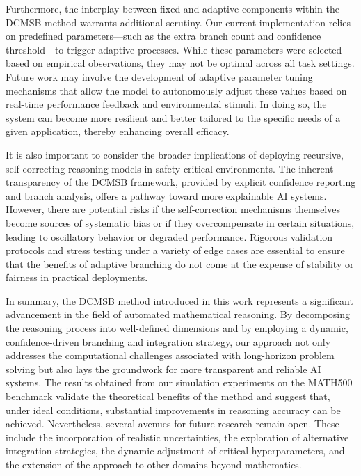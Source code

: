 \documentclass{article}
\begin{document}
Furthermore, the interplay between fixed and adaptive components within the DCMSB method warrants additional scrutiny. Our current implementation relies on predefined parameters—such as the extra branch count and confidence threshold—to trigger adaptive processes. While these parameters were selected based on empirical observations, they may not be optimal across all task settings. Future work may involve the development of adaptive parameter tuning mechanisms that allow the model to autonomously adjust these values based on real-time performance feedback and environmental stimuli. In doing so, the system can become more resilient and better tailored to the specific needs of a given application, thereby enhancing overall efficacy.

It is also important to consider the broader implications of deploying recursive, self-correcting reasoning models in safety-critical environments. The inherent transparency of the DCMSB framework, provided by explicit confidence reporting and branch analysis, offers a pathway toward more explainable AI systems. However, there are potential risks if the self-correction mechanisms themselves become sources of systematic bias or if they overcompensate in certain situations, leading to oscillatory behavior or degraded performance. Rigorous validation protocols and stress testing under a variety of edge cases are essential to ensure that the benefits of adaptive branching do not come at the expense of stability or fairness in practical deployments.

In summary, the DCMSB method introduced in this work represents a significant advancement in the field of automated mathematical reasoning. By decomposing the reasoning process into well-defined dimensions and by employing a dynamic, confidence-driven branching and integration strategy, our approach not only addresses the computational challenges associated with long-horizon problem solving but also lays the groundwork for more transparent and reliable AI systems. The results obtained from our simulation experiments on the MATH500 benchmark validate the theoretical benefits of the method and suggest that, under ideal conditions, substantial improvements in reasoning accuracy can be achieved. Nevertheless, several avenues for future research remain open. These include the incorporation of realistic uncertainties, the exploration of alternative integration strategies, the dynamic adjustment of critical hyperparameters, and the extension of the approach to other domains beyond mathematics.
\end{document}
